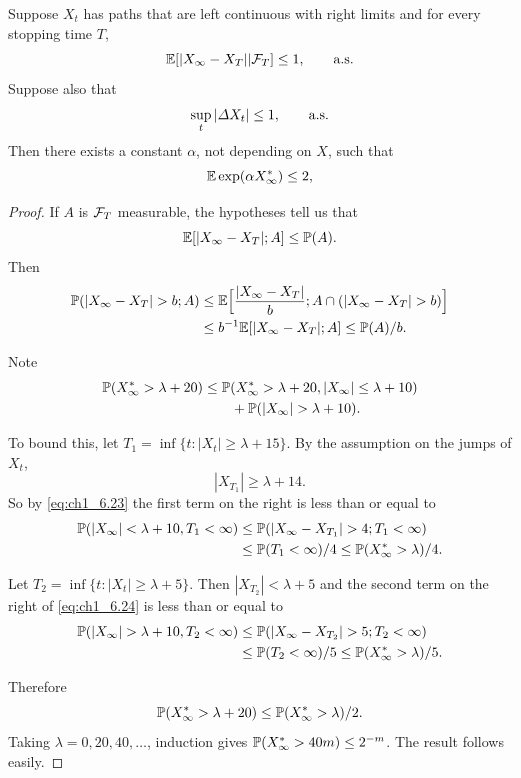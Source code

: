 \begin{theorem}\label{thm:ch1_6.11}
Suppose $X_t$ has paths that are left continuous with right limits and for every stopping time $T$,
\[
    \E[|X_\infty - X_T|\mid \FC_T] \leq 1, \qquad \textnormal{a.s.}
\]
Suppose also that
\[
    \sup_t |\Delta X_t| \leq 1, \qquad \textnormal{a.s.}
\]
Then there exists a constant $\alpha$, not depending on $X$, such that
\[
    \E \exp(\alpha X_\infty^*) \leq 2,
\]
\end{theorem}

\begin{proof}
If $A$ is $\FC_T$ measurable, the hypotheses tell us that
\begin{equation}\label{eq:ch1_6.22}
    \E[|X_\infty - X_T|; A] \leq \P(A).
\end{equation}
Then
\begin{align}\label{eq:ch1_6.23}
    \P(|X_\infty - X_T| > b; A) &\leq \E\Big[\frac{|X_\infty - X_T|}{b}; A \cap (|X_\infty - X_T| > b)\Big] \\
    &\leq b^{-1}\E[|X_\infty-X_T|;A]\leq \P(A)/b. \notag
\end{align}

Note
\begin{align}\label{eq:ch1_6.24}
    \P(X_\infty^* > \lambda + 20) &\leq \P(X_\infty^* > \lambda + 20, |X_\infty| \leq \lambda + 10) \\
    &\qquad + \P(|X_\infty| > \lambda + 10). \notag
\end{align}

To bound this, let $T_1 = \inf\{t : |X_t| \geq \lambda + 15\}$. By the assumption on the jumps of $X_t$,
\[
|X_{T_1}| \geq \lambda + 14.
\]
So by \eqref{eq:ch1_6.23} the first term on the right is less than or equal to
\begin{align*}
    \P(|X_\infty| < \lambda + 10, T_1 < \infty) &\leq \P(|X_\infty - X_{T_1}| > 4; T_1 < \infty) \\
    &\leq \P(T_1 < \infty)/4 \leq \P(X_\infty^* > \lambda)/4.
\end{align*}

Let $T_2 = \inf\{t : |X_t| \geq \lambda + 5\}$. Then $|X_{T_2}| < \lambda + 5$ and the second term on the right of \eqref{eq:ch1_6.24} is less than or equal to
\begin{align*}
    \P(|X_\infty| > \lambda + 10, T_2 < \infty) &\leq \P(|X_\infty - X_{T_2}| > 5; T_2 < \infty) \\
    &\leq \P(T_2 < \infty)/5 \leq \P(X_\infty^* > \lambda)/5.
\end{align*}

Therefore
\[
    \P(X_\infty^* > \lambda + 20) \leq \P(X_\infty^* > \lambda)/2.
\]
Taking $\lambda = 0, 20, 40, \ldots$, induction gives $\P(X_\infty^* > 40m) \leq 2^{-m}$. The result follows easily.
\end{proof}

